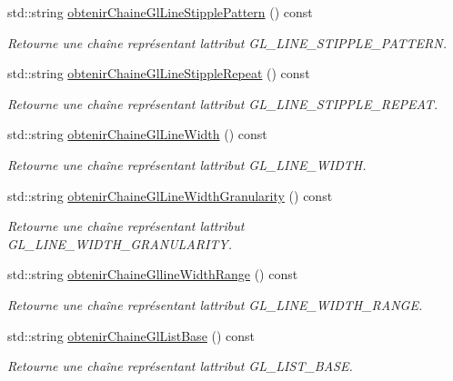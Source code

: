 \begin{DoxyCompactItemize}
std\+::string \hyperlink{group__utilitaire_gaf5594a01ce0e3ce08073c9d8adc2dc7d}{obtenir\+Chaine\+Gl\+Line\+Stipple\+Pattern} () const 
\begin{DoxyCompactList}\small\item\em Retourne une chaîne représentant l\textquotesingle{}attribut G\+L\+\_\+\+L\+I\+N\+E\+\_\+\+S\+T\+I\+P\+P\+L\+E\+\_\+\+P\+A\+T\+T\+E\+R\+N. \end{DoxyCompactList}\item 
std\+::string \hyperlink{group__utilitaire_gab9b326741292e41732d5e0b646c4f006}{obtenir\+Chaine\+Gl\+Line\+Stipple\+Repeat} () const 
\begin{DoxyCompactList}\small\item\em Retourne une chaîne représentant l\textquotesingle{}attribut G\+L\+\_\+\+L\+I\+N\+E\+\_\+\+S\+T\+I\+P\+P\+L\+E\+\_\+\+R\+E\+P\+E\+A\+T. \end{DoxyCompactList}\item 
std\+::string \hyperlink{group__utilitaire_gacd329652ea9f177db0c0ad44bc9150bd}{obtenir\+Chaine\+Gl\+Line\+Width} () const 
\begin{DoxyCompactList}\small\item\em Retourne une chaîne représentant l\textquotesingle{}attribut G\+L\+\_\+\+L\+I\+N\+E\+\_\+\+W\+I\+D\+T\+H. \end{DoxyCompactList}\item 
std\+::string \hyperlink{group__utilitaire_ga42e5a43f490a0f90bedf54064921de10}{obtenir\+Chaine\+Gl\+Line\+Width\+Granularity} () const 
\begin{DoxyCompactList}\small\item\em Retourne une chaîne représentant l\textquotesingle{}attribut G\+L\+\_\+\+L\+I\+N\+E\+\_\+\+W\+I\+D\+T\+H\+\_\+\+G\+R\+A\+N\+U\+L\+A\+R\+I\+T\+Y. \end{DoxyCompactList}\item 
std\+::string \hyperlink{group__utilitaire_gacdf3e63f9464f755958fb682f2a45015}{obtenir\+Chaine\+Glline\+Width\+Range} () const 
\begin{DoxyCompactList}\small\item\em Retourne une chaîne représentant l\textquotesingle{}attribut G\+L\+\_\+\+L\+I\+N\+E\+\_\+\+W\+I\+D\+T\+H\+\_\+\+R\+A\+N\+G\+E. \end{DoxyCompactList}\item 
std\+::string \hyperlink{group__utilitaire_ga869ac6c34aaec533fb74b4e8095ae993}{obtenir\+Chaine\+Gl\+List\+Base} () const 
\begin{DoxyCompactList}\small\item\em Retourne une chaîne représentant l\textquotesingle{}attribut G\+L\+\_\+\+L\+I\+S\+T\+\_\+\+B\+A\+S\+E. \end{DoxyCompactList}\item 

\end{DoxyCompactItemize}
